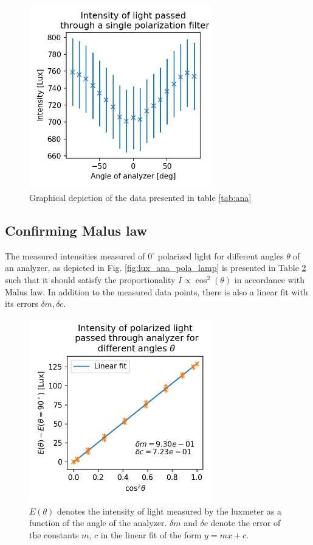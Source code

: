 \documentclass[%
 reprint,
 amsmath,amssymb,
 aps,
]{revtex4-1}
\begin{document}
  \begin{figure}[h!]
    \center
    \includegraphics[width=8cm]{scripts/polartest.png}
    \caption{Graphical depiction of the data presented in table \ref{tab:ana}}
    \label{fig:ana_plot}
  \end{figure}

  \subsection{Confirming Malus law}

  The measured intensities measured of $0^\circ$ polarized light for different angles $\theta$ of an analyzer, as depicted in Fig. \ref{fig:lux_ana_pola_lamp} is presented in Table \ref{fig:malus1} such that it should satisfy the proportionality $I \propto \cos^2(\theta)$ in accordance with Malus law. In addition to the measured data points, there is also a linear fit with its errors $\delta m, \delta c$.


  \begin{figure}[h!]
    \center
    \includegraphics[width=8cm]{scripts/malus1.png}
    \caption{$E(\theta)$ denotes the intensity of light measured by the luxmeter as a function of the angle of the analyzer. $\delta m$ and $\delta c$ denote the error of the constants $m$, $c$ in the linear fit of the form $y=mx+c$.}
    \label{fig:malus1}
  \end{figure}
\end{document}
